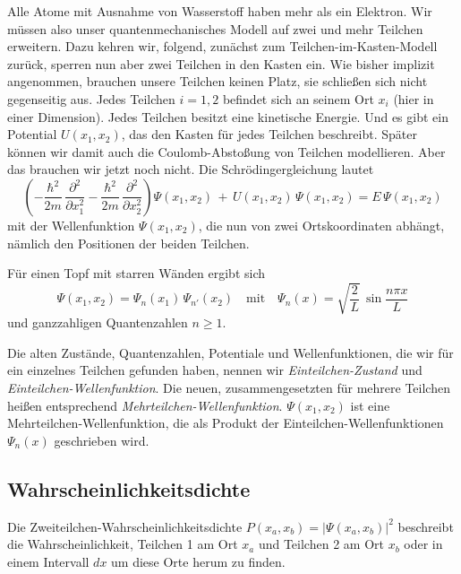 Alle Atome mit Ausnahme von Wasserstoff haben mehr als ein Elektron. Wir müssen also unser quantenmechanisches Modell auf zwei und mehr Teilchen erweitern. Dazu kehren wir, \cite{Harris_moderne_Physik} folgend, zunächst zum Teilchen-im-Kasten-Modell zurück, sperren nun aber zwei Teilchen in den Kasten ein. Wie bisher implizit angenommen, brauchen unsere Teilchen keinen Platz, sie schließen sich nicht gegenseitig aus. Jedes Teilchen $i=1,2$ befindet sich an seinem Ort $x_i$ (hier in einer Dimension). Jedes Teilchen besitzt eine kinetische Energie. Und es gibt ein Potential $U(x_1, x_2)$, das den Kasten für jedes Teilchen beschreibt. Später können wir damit auch die Coulomb-Abstoßung von Teilchen modellieren. Aber das brauchen wir jetzt noch nicht. Die Schrödingergleichung lautet
\begin{equation}
    \left(
        - \frac{\hbar^2}{2m} \, \frac{\partial^2}{\partial x_1^2} 
        - \frac{\hbar^2}{2m} \, \frac{\partial^2}{\partial x_2^2} 
     \right)
     \Psi(x_1, x_2)
     \, + \,
     U(x_1, x_2) \, \Psi(x_1, x_2)
     = E \, \Psi(x_1, x_2)
\end{equation}
mit der Wellenfunktion $\Psi(x_1, x_2)$, die nun von zwei Ortskoordinaten abhängt, nämlich den Positionen der beiden Teilchen.

Für einen Topf mit starren Wänden ergibt sich
\begin{equation}
    \Psi(x_1, x_2) = \Psi_{n}(x_1) \, \Psi_{n'}(x_2) \quad
    \text{mit} \quad \Psi_n(x) = \sqrt{\frac{2}{L}} \, \sin \frac{n \pi x}{L}
\end{equation}
und ganzzahligen Quantenzahlen $n \ge 1$.

Die alten Zustände, Quantenzahlen, Potentiale und Wellenfunktionen, die wir für ein einzelnes Teilchen gefunden haben, nennen wir \emph{Einteilchen-Zustand} und \emph{Einteilchen-Wellenfunktion}. Die neuen, zusammengesetzten für mehrere Teilchen heißen entsprechend \emph{Mehrteilchen-Wellenfunktion}. $\Psi(x_1, x_2)$ ist eine Mehrteilchen-Wellenfunktion, die als Produkt der Einteilchen-Wellenfunktionen $ \Psi_n(x)$ geschrieben wird.

\subsection{Wahrscheinlichkeitsdichte}

Die Zweiteilchen-Wahrscheinlichkeitsdichte $P(x_a, x_b) = | \Psi(x_a, x_b)|^2$ beschreibt die Wahrscheinlichkeit, Teilchen 1 am Ort $x_a$ und Teilchen 2 am Ort $x_b$ oder in einem Intervall $dx$ um diese Orte herum zu finden.

